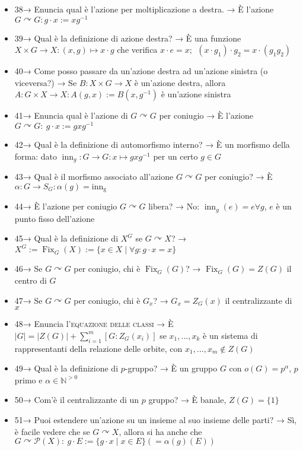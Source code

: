 \documentclass[A4,12pt]{article}
\newcommand{\N}{\mathbb{N}}
\newcommand{\acts}{\curvearrowright}
\begin{document}
\begin{itemize}[noitemsep]
		\item 38→ Enuncia qual è l'azione per moltiplicazione a destra. → 	È l'azione $ G\acts G: g\cdot x := xg^{-1} $
		\item 39→ Qual è la definizione di azione destra? → È una funzione $ X\times G\to X: (x,g)\mapsto x\cdot g $ che verifica $ x\cdot  e = x;\ \ (x\cdot g_1)\cdot g_2 = x\cdot (g_1g_2) $
		\item 40→ Come posso passare da un'azione destra ad un'azione sinistra (o viceversa?) → Se $ B:X\times G\to X $ è un'azione destra, allora $ A:G\times X\to X: A(g,x):=B(x,g^{-1}) $ è un'azione sinistra
		\item 41→ Enuncia qual è l'azione di $ G\acts G $ per coniugio → È l'azione $ G\acts G:\ g\cdot x := gxg^{-1} $
		\item 42→ Qual è la definizione di automorfismo interno? → È un morfismo della forma: dato $ \operatorname{inn}_g:G\to G:x\mapsto gxg^{-1} $ per un certo $ g\in G $
		\item 43→ Qual è il morfismo associato all'azione $ G\acts G $ per coniugio? → È $ \alpha:G\to S_G:\alpha(g) = \operatorname{inn_g} $
		\item 44→ È l'azione per coniugio $ G\acts G $ libera? → No: $ \operatorname{inn}_g(e) = e \forall g $, $ e $ è un punto fisso dell'azione
		\item 45→ Qual è la definizione di $ X^G $ se $ G\acts X $? → $ X^G := \operatorname{Fix}_G(X):=\{x\in X\mid \forall g: g\cdot x=x\}$
		\item 46→ Se $ G\acts G $ per coniugio, chi è $ \operatorname{Fix}_G(G) $? → $ \operatorname{Fix}_G(G) = Z(G) $ il centro di $ G $ 
		\item 47→ Se $ G\acts G $ per coniugio, chi è $ G_x $? →  $ G_x = Z_G(x) $ il centralizzante di $ x $
		\item 48→ Enuncia l'\textsc{equazione delle classi} → È $ |G| = |Z(G)|+\sum_{i=1}^m [G:Z_G(x_i)] $ se $ x_1,...,x_k  $ è un sistema di rappresentanti della relazione delle orbite, con $ x_1,...,x_m \not \in Z(G)$
		\item 49→ Qual è la definizione di $ p $-gruppo? → È un gruppo $ G $ con $ o(G)=p^\alpha$, $ p $ primo e $ \alpha \in \N^{>0} $ 
		\item 50→ Com'è il centralizzante di un $ p $ gruppo? → È banale, $ Z(G) =\{1\} $
		\item 51→ Puoi estendere un'azione su un insieme al suo insieme delle parti? → Sì, è facile vedere che se $ G\acts X $, allora si ha anche che $ G\acts \mathcal{P}(X):\ g\cdot E := \{g\cdot x\mid x\in E\}(=\alpha(g)(E)) $ 

\end{itemize}
\end{document}
